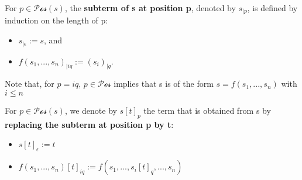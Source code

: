   \begin{definition}
    For $p \in \mathcal{Pos}(s)$, the \textbf{subterm of s at position p}, denoted by $s_{|p}$, is defined by induction on the length of p:
    \begin{itemize}
      \item $s_{|\epsilon} := s$, and
      \item $f(s_1,...,s_n)_{|iq} := \left(s_i\right)_{|q}$.
    \end{itemize} 
    
    Note that, for $p = iq$, $p \in \mathcal{Pos}$ implies that s is of the form $s = f(s_1,...,s_n)$ with $i \le n$
    
    For $p \in \mathcal{Pos}(s)$, we denote by $s[t]_p$ the term that is obtained from s by \textbf{replacing the subterm at position p by t}:
  \begin{itemize}
    \item $s[t]_\epsilon := t$
    \item $f(s_1,...,s_n)[t]_{iq} := f(s_1,...,s_i[t]_{q},...,s_n)$
  \end{itemize}
  
  \end{definition}
  
  
  
